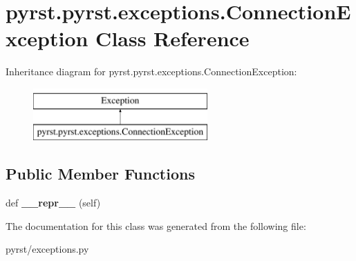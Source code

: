 \hypertarget{classpyrst_1_1pyrst_1_1exceptions_1_1_connection_exception}{}\section{pyrst.\+pyrst.\+exceptions.\+Connection\+Exception Class Reference}
\label{classpyrst_1_1pyrst_1_1exceptions_1_1_connection_exception}
Inheritance diagram for pyrst.\+pyrst.\+exceptions.\+Connection\+Exception\+:\begin{figure}[H]
\begin{center}
\leavevmode
\includegraphics[height=2.000000cm]{classpyrst_1_1pyrst_1_1exceptions_1_1_connection_exception}
\end{center}
\end{figure}
\subsection*{Public Member Functions}
\begin{DoxyCompactItemize}
\item 
\hypertarget{classpyrst_1_1pyrst_1_1exceptions_1_1_connection_exception_a656fe7d3628524a52c21291116affe1a}{}def {\bfseries \+\_\+\+\_\+repr\+\_\+\+\_\+} (self)\label{classpyrst_1_1pyrst_1_1exceptions_1_1_connection_exception_a656fe7d3628524a52c21291116affe1a}

\end{DoxyCompactItemize}


The documentation for this class was generated from the following file\+:\begin{DoxyCompactItemize}
\item 
pyrst/exceptions.\+py\end{DoxyCompactItemize}
